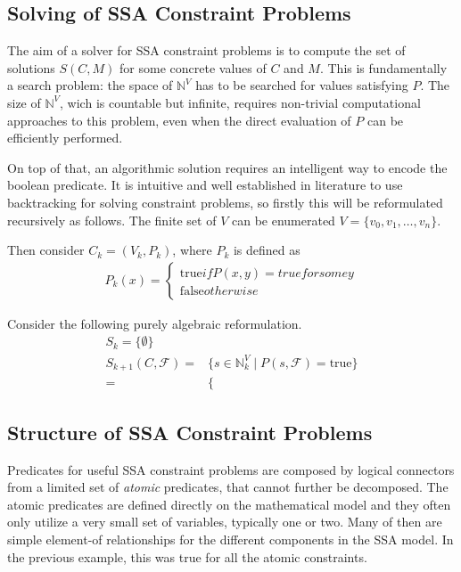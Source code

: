 \subsection{Solving of SSA Constraint Problems}

    The aim of a solver for SSA constraint problems is to compute the set of
    solutions $S(C,M)$ for some concrete values of $C$ and $M$.
    This is fundamentally a search problem: the space of $\mathbb N^V$ has to be
    searched for values satisfying $P$.
    The size of $\mathbb N^V$, wich is countable but infinite, requires
    non-trivial computational approaches to this problem, even when the direct
    evaluation of $P$ can be efficiently performed.

    On top of that, an algorithmic solution requires an intelligent way to
    encode the boolean predicate.
    It is intuitive and well established in literature to use backtracking for
    solving constraint problems, so firstly this will be reformulated
    recursively as follows.
    The finite set of $V$ can be enumerated $V=\{v_0,v_1,\dots,v_n\}$.

    Then consider $C_k=(V_k,P_k)$, where $P_k$ is defined as
    \begin{align*}
        P_k(x)=\left\{\begin{array}{l}\text{true} if P(x,y)=true for some y\\
                                      \text{false} otherwise\end{array}\right.
    \end{align*}

    Consider the following purely algebraic reformulation.
    \begin{align*}
        S_k=\{\emptyset\}\\
        S_{k+1}(C,\mathcal F)=&\{s\in\mathbb N^V_k\mid P(s,\mathcal F)=\text{true}\}\\
                             =&\{
    \end{align*}

\subsection{Structure of SSA Constraint Problems}

    Predicates for useful SSA constraint problems are composed by logical
    connectors from a limited set of {\em atomic} predicates, that cannot
    further be decomposed.
    The atomic predicates are defined directly on the mathematical model and
    they often only utilize a very small set of variables, typically one or two.
    Many of then are simple element-of relationships for the different
    components in the SSA model.
    In the previous example, this was true for all the atomic constraints.

